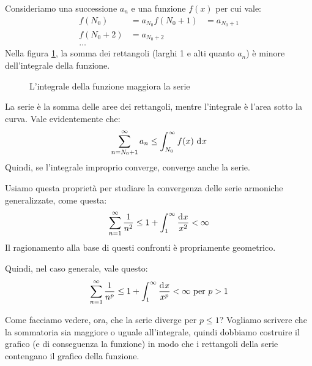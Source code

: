 Consideriamo una successione $a_n$ e una funzione $f(x)$ per cui vale:
\begin{align*}
f(N_0) &= a_{N_0}
f(N_0 + 1) &= a_{N_0 + 1} \\
f(N_0 + 2) &= a_{N_0 + 2} \\
\ldots 
\end{align*}
Nella figura \ref{fig:integrale_maggiora_serie}, la somma dei rettangoli (larghi 1 e alti quanto $a_n$) \`e minore dell'integrale della funzione.

\begin{figure}[h]
\centering
{}
\caption{\label{fig:integrale_maggiora_serie}L'integrale della funzione maggiora la serie}
\end{figure}

La serie \`e la somma delle aree dei rettangoli, mentre l'integrale \`e l'area sotto la curva. Vale evidentemente che:
\[
\sum_{n = N_0 + 1}^{\infty} a_n \le \int_{N_0}^{\infty} f(x) \dx
\]
Quindi, se l'integrale improprio converge, converge anche la serie.

Usiamo questa propriet\`a per studiare la convergenza delle serie armoniche generalizzate, come questa:
\[
\sum_{n = 1}^{\infty} \frac{1}{n^2} \le 1 + \int_{1}^{\infty} \frac{\diff x}{x^2} < \infty
\]
Il ragionamento alla base di questi confronti \`e propriamente geometrico. 

Quindi, nel caso generale, vale questo:
\[
\sum_{n = 1}^{\infty} \frac{1}{n^p} \le 1 + \int_{1}^{\infty} \frac{\diff x}{x^p} < \infty \text{ per } p > 1
\]

Come facciamo vedere, ora, che la serie diverge per $p \le 1$? Vogliamo scrivere che la sommatoria sia maggiore o uguale all'integrale, quindi dobbiamo costruire il grafico (e di conseguenza la funzione) in modo che i rettangoli della serie contengano il grafico della funzione.

